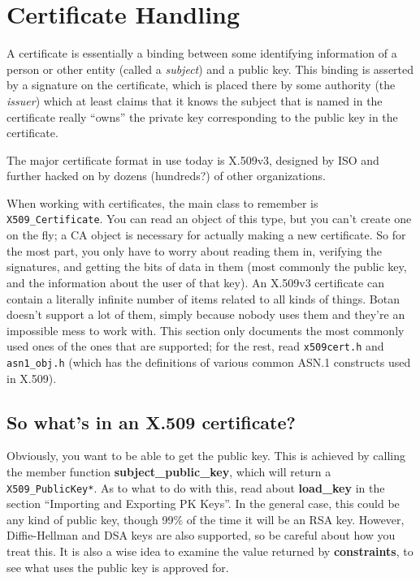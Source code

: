 \documentclass{article}
\newcommand{\filename}[1]{\texttt{#1}}
\newcommand{\function}[1]{\textbf{#1}}
\newcommand{\type}[1]{\texttt{#1}}
\begin{document}
\pagebreak

\section{Certificate Handling}

A certificate is essentially a binding between some identifying information of
a person or other entity (called a \emph{subject}) and a public key. This
binding is asserted by a signature on the certificate, which is placed there by
some authority (the \emph{issuer}) which at least claims that it knows the
subject that is named in the certificate really ``owns'' the private key
corresponding to the public key in the certificate.

The major certificate format in use today is X.509v3, designed by ISO and
further hacked on by dozens (hundreds?) of other organizations.

When working with certificates, the main class to remember is
\type{X509\_Certificate}. You can read an object of this type, but you can't
create one on the fly; a CA object is necessary for actually making a new
certificate. So for the most part, you only have to worry about reading them
in, verifying the signatures, and getting the bits of data in them (most
commonly the public key, and the information about the user of that key). An
X.509v3 certificate can contain a literally infinite number of items related to
all kinds of things. Botan doesn't support a lot of them, simply because nobody
uses them and they're an impossible mess to work with. This section only
documents the most commonly used ones of the ones that are supported; for the
rest, read \filename{x509cert.h} and \filename{asn1\_obj.h} (which has the
definitions of various common ASN.1 constructs used in X.509).

\subsection{So what's in an X.509 certificate?}

Obviously, you want to be able to get the public key. This is achieved by
calling the member function \function{subject\_public\_key}, which will return
a \type{X509\_PublicKey*}. As to what to do with this, read about
\function{load\_key} in the section ``Importing and Exporting PK Keys''. In the
general case, this could be any kind of public key, though 99\% of the time it
will be an RSA key. However, Diffie-Hellman and DSA keys are also supported, so
be careful about how you treat this. It is also a wise idea to examine the
value returned by \function{constraints}, to see what uses the public key is
approved for.
\end{document}
